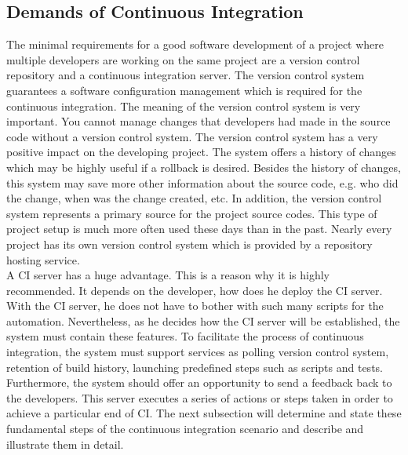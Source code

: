 \subsection{Demands of Continuous Integration}

The minimal requirements for a good software development of a project where multiple developers are working on the same project are a version control repository and a continuous integration server. The version control system guarantees a software configuration management which is required for the continuous integration. The meaning of the version control system is very important. You cannot manage changes that developers had made in the source code without a version control system. The version control system has a very positive impact on the developing project. The system offers a history of changes which may be highly useful if a rollback is desired. Besides the history of changes, this system may save more other information about the source code, e.g. who did the change, when was the change created, etc. In addition, the version control system represents a primary source for the project source codes. This type of project setup is much more often used these days than in the past. Nearly every project has its own version control system which is provided by a repository hosting service.\\

A CI server has a huge advantage. This is a reason why it is highly recommended. It depends on the developer, how does he deploy the CI server. With the CI server, he does not have to bother with such many scripts for the automation. Nevertheless, as he decides how the CI server will be established, the system must contain these features. To facilitate the process of continuous integration, the system must support services as polling version control system, retention of build history, launching predefined steps such as scripts and tests. Furthermore, the system should offer an opportunity to send a feedback back to the developers. This server executes a series of actions or steps taken in order to achieve a particular end of CI. The next subsection will determine and state these fundamental steps of the continuous integration scenario and describe and illustrate them in detail.

